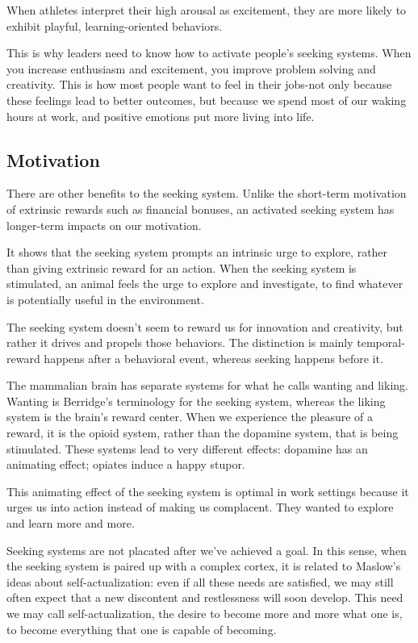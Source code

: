 \documentclass[ebook,12pt,oneside,openany]{memoir}
\begin{document}
When athletes interpret their high arousal as excitement, they are more likely to exhibit playful, learning-oriented behaviors.

This is why leaders need to know how to activate people's seeking systems.
When you increase enthusiasm and excitement, you improve problem solving and creativity.
This is how most people want to feel in their jobs-not only because these feelings lead to better 
outcomes, but because we spend most of our waking hours at work, and positive emotions put more living into life.

\subsection{Motivation}
There are other benefits to the seeking system. 
Unlike the short-term motivation of extrinsic rewards such as financial bonuses,
an activated seeking system has longer-term impacts on our motivation.

It shows that the seeking system prompts an intrinsic urge to explore, rather than
giving extrinsic reward for an action.
When the seeking system is stimulated, an animal feels the urge to explore and investigate,
to find whatever is potentially useful in the environment.

The seeking system doesn't seem to reward us for innovation and creativity, 
but rather it drives and propels those behaviors.
The distinction is mainly temporal-reward happens after a behavioral event, whereas seeking happens before it.

The mammalian brain has separate systems for what he calls wanting and liking.
Wanting is Berridge's terminology for the seeking system, whereas the liking system is the brain's reward center.
When we experience the pleasure of a reward, it is the opioid system, rather than the dopamine system, that is being stimulated.
These systems lead to very different effects: dopamine has an animating effect; opiates induce a happy stupor.

This animating effect of the seeking system is optimal in work settings because it urges us into action
instead of making us complacent. They wanted to explore and learn more and more.

Seeking systems are not placated after we've achieved a goal. In this sense, 
when the seeking system is paired up with a complex cortex, it is related to Maslow's ideas about self-actualization:
even if all these needs are satisfied, we may still often expect that a new discontent and restlessness will soon develop.
This need we may call self-actualization, the desire to become more and more what one is, to become everything that one is capable 
of becoming.
\end{document}
